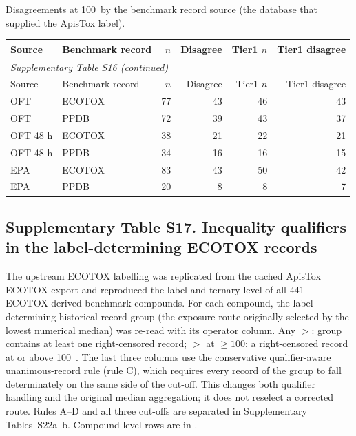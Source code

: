 Disagreements at 100~\ugbee by the benchmark record source (the database that supplied the ApisTox label).

\begingroup\footnotesize\setlength{\tabcolsep}{4pt}

\begin{longtable}{llrrrr}

\toprule Source & Benchmark record & $n$ & Disagree & Tier1 $n$ & Tier1 disagree \\ \midrule\endfirsthead

\multicolumn{6}{l}{\textit{Supplementary Table S16 (continued)}} \\

\toprule Source & Benchmark record & $n$ & Disagree & Tier1 $n$ & Tier1 disagree \\ \midrule\endhead

\bottomrule\endlastfoot

OFT & ECOTOX & 77 & 43 & 46 & 43 \\
OFT & PPDB & 72 & 39 & 43 & 37 \\
OFT 48 h & ECOTOX & 38 & 21 & 22 & 21 \\
OFT 48 h & PPDB & 34 & 16 & 16 & 15 \\
EPA & ECOTOX & 83 & 43 & 50 & 42 \\
EPA & PPDB & 20 & 8 & 8 & 7 \\

\end{longtable}\endgroup

\subsection*{Supplementary Table S17. Inequality qualifiers in the label-determining ECOTOX records}

The upstream ECOTOX labelling was replicated from the cached ApisTox ECOTOX export and reproduced the label and ternary level of all 441 ECOTOX-derived benchmark compounds. For each compound, the label-determining historical record group (the exposure route originally selected by the lowest numerical median) was re-read with its operator column. Any $>$: group contains at least one right-censored record; $>$ at $\geq100$: a right-censored record at or above 100~\ugbee. The last three columns use the conservative qualifier-aware unanimous-record rule (rule C), which requires every record of the group to fall determinately on the same side of the cut-off. This changes both qualifier handling and the original median aggregation; it does not reselect a corrected route. Rules A--D and all three cut-offs are separated in Supplementary Tables~S22a--b. Compound-level rows are in .

